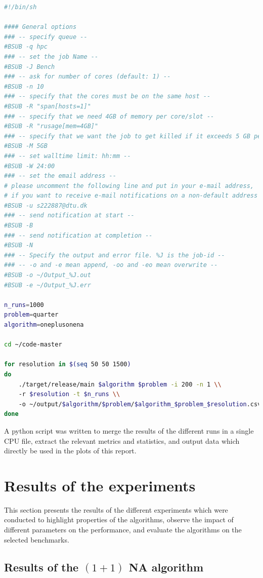 \begin{lstlisting}[language=bash, caption=Example of a job script, label=lst:job_script]
#!/bin/sh

#### General options
### -- specify queue --
#BSUB -q hpc
### -- set the job Name --
#BSUB -J Bench
### -- ask for number of cores (default: 1) --
#BSUB -n 10
### -- specify that the cores must be on the same host --
#BSUB -R "span[hosts=1]"
### -- specify that we need 4GB of memory per core/slot --
#BSUB -R "rusage[mem=4GB]"
### -- specify that we want the job to get killed if it exceeds 5 GB per core/slot --
#BSUB -M 5GB
### -- set walltime limit: hh:mm --
#BSUB -W 24:00
### -- set the email address --
# please uncomment the following line and put in your e-mail address,
# if you want to receive e-mail notifications on a non-default address
#BSUB -u s222887@dtu.dk
### -- send notification at start --
#BSUB -B
### -- send notification at completion --
#BSUB -N
### -- Specify the output and error file. %J is the job-id --
### -- -o and -e mean append, -oo and -eo mean overwrite --
#BSUB -o ~/Output_%J.out
#BSUB -e ~/Output_%J.err

n_runs=1000
problem=quarter
algorithm=oneplusonena

cd ~/code-master

for resolution in $(seq 50 50 1500)
do
    ./target/release/main $algorithm $problem -i 200 -n 1 \\
    -r $resolution -t $n_runs \\
    -o ~/output/$algorithm/$problem/$algorithm_$problem_$resolution.csv
done
\end{lstlisting}

A python script was written to merge the results of the different runs in a single CPU file, extract the relevant metrics and statistics, and output data which directly be used
in the  plots of this report.

\section{Results of the experiments}

This section presents the results of the different experiments which were conducted to highlight properties of the algorithms, observe the impact of different parameters on the performance,
and evaluate the algorithms on the selected benchmarks.

\subsection{Results of the $(1 + 1)$ NA algorithm}

